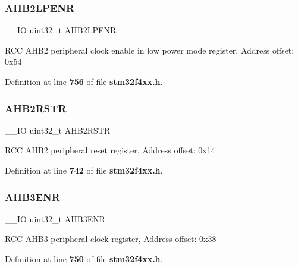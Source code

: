 \mbox{\label{structRCC__TypeDef_a2b30982547fae7d545d260312771b5c9}} 
\subsubsection{A\+H\+B2\+L\+P\+E\+NR}
{\footnotesize\ttfamily \+\_\+\+\_\+\+IO uint32\+\_\+t A\+H\+B2\+L\+P\+E\+NR}

R\+CC A\+H\+B2 peripheral clock enable in low power mode register, Address offset\+: 0x54 

Definition at line \textbf{ 756} of file \textbf{ stm32f4xx.\+h}.

\mbox{\label{structRCC__TypeDef_a78a5aa9dd5694c48a7d8e66888a46450}} 
\subsubsection{A\+H\+B2\+R\+S\+TR}
{\footnotesize\ttfamily \+\_\+\+\_\+\+IO uint32\+\_\+t A\+H\+B2\+R\+S\+TR}

R\+CC A\+H\+B2 peripheral reset register, Address offset\+: 0x14 

Definition at line \textbf{ 742} of file \textbf{ stm32f4xx.\+h}.

\mbox{\label{structRCC__TypeDef_acdaa650fcd63730825479f6e8f70d4c0}} 
\subsubsection{A\+H\+B3\+E\+NR}
{\footnotesize\ttfamily \+\_\+\+\_\+\+IO uint32\+\_\+t A\+H\+B3\+E\+NR}

R\+CC A\+H\+B3 peripheral clock register, Address offset\+: 0x38 

Definition at line \textbf{ 750} of file \textbf{ stm32f4xx.\+h}.

\mbox{\label{structRCC__TypeDef_a2ff82b9bf0231645108965aa0febd766}} 
